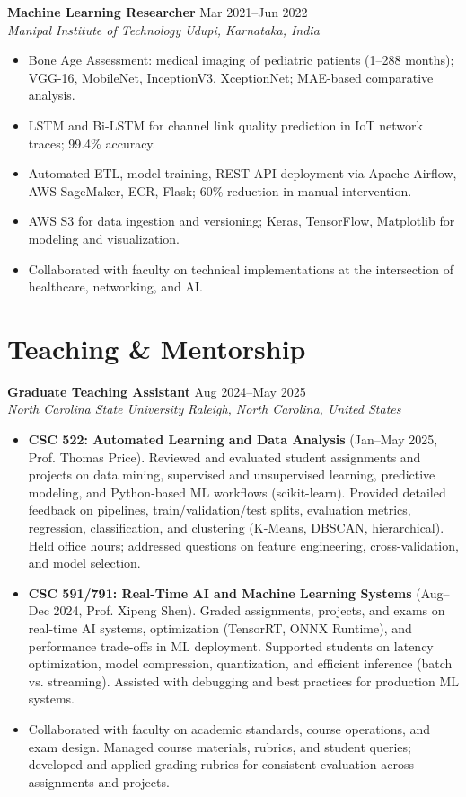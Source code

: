 \documentclass[11pt,a4paper]{article}
\newcommand{\cvEntry}[4]{\textbf{#1} \hfill #2 \\ \textit{#3} \hfill \textit{#4} \vspace{2pt}}
\newcommand{\cvItem}[1]{\item \small #1 \vspace{-1pt}}
\begin{document}
\cvEntry{Machine Learning Researcher}{Mar 2021--Jun 2022}{Manipal Institute of Technology}{Udupi, Karnataka, India}
\begin{itemize}[leftmargin=*,nosep]
  \cvItem{Bone Age Assessment: medical imaging of pediatric patients (1--288 months); VGG-16, MobileNet, InceptionV3, XceptionNet; MAE-based comparative analysis.}
  \cvItem{LSTM and Bi-LSTM for channel link quality prediction in IoT network traces; 99.4\% accuracy.}
  \cvItem{Automated ETL, model training, REST API deployment via Apache Airflow, AWS SageMaker, ECR, Flask; 60\% reduction in manual intervention.}
  \cvItem{AWS S3 for data ingestion and versioning; Keras, TensorFlow, Matplotlib for modeling and visualization.}
  \cvItem{Collaborated with faculty on technical implementations at the intersection of healthcare, networking, and AI.}
\end{itemize}
\vspace{4pt}


\section{Teaching \& Mentorship}

\cvEntry{Graduate Teaching Assistant}{Aug 2024--May 2025}{North Carolina State University}{Raleigh, North Carolina, United States}
\begin{itemize}[leftmargin=*,nosep]
  \cvItem{\textbf{CSC 522: Automated Learning and Data Analysis} (Jan--May 2025, Prof. Thomas Price). Reviewed and evaluated student assignments and projects on data mining, supervised and unsupervised learning, predictive modeling, and Python-based ML workflows (scikit-learn). Provided detailed feedback on pipelines, train/validation/test splits, evaluation metrics, regression, classification, and clustering (K-Means, DBSCAN, hierarchical). Held office hours; addressed questions on feature engineering, cross-validation, and model selection.}
  \cvItem{\textbf{CSC 591/791: Real-Time AI and Machine Learning Systems} (Aug--Dec 2024, Prof. Xipeng Shen). Graded assignments, projects, and exams on real-time AI systems, optimization (TensorRT, ONNX Runtime), and performance trade-offs in ML deployment. Supported students on latency optimization, model compression, quantization, and efficient inference (batch vs. streaming). Assisted with debugging and best practices for production ML systems.}
  \cvItem{Collaborated with faculty on academic standards, course operations, and exam design. Managed course materials, rubrics, and student queries; developed and applied grading rubrics for consistent evaluation across assignments and projects.}
\end{itemize}
\vspace{4pt}
\end{document}
